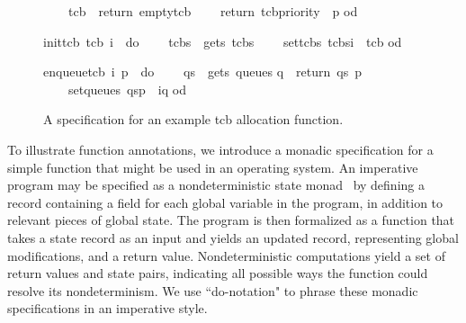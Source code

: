 \documentclass[submission]{eptcs}
\newcommand{\isafun}[1]{{\sf #1}}
\begin{document}
\begin{isabellebody}
\begin{isamarkuptext}
\begin{figure}[tb]
\begin{minipage}[t]{0.5\textwidth}
\begin{isabelle}
\ \ \ \ tcb\ {}\ \isafun{return}\ \isafun{empty{}tcb}{}\isanewline
\ \ \ \ \isafun{return}\ {}tcb{}priority\ {}{}\ p{}{}\isanewline
\isafun{od}\end{isabelle}
\begin{isabelle}\isafun{init{}tcb}\ tcb\ i\ {}\ \isafun{do}\isanewline
\ \ \ \ tcbs\ {}\ \isafun{gets}\ \isafun{tcbs}{}\isanewline
\ \ \ \ \isafun{set{}tcbs}\ {}tcbs{}i\ {}\ tcb{}{}\isanewline
\isafun{od}\end{isabelle}
\begin{isabelle}\isafun{enqueue{}tcb}\ i\ p\ {}\ \isafun{do}\isanewline
\ \ \ \ qs\ {}\ \isafun{gets}\ \isafun{queues}{}\isanewline
\isaindent{\ \ \ \ }q\ {}\ \isafun{return}\ {}qs\ p{}{}\isanewline
\ \ \ \ \isafun{set{}queues}\ {}qs{}p\ {}{}\ i{}q{}{}\isanewline
\isafun{od}\end{isabelle}
\end{minipage}
\caption{A specification for an example tcb allocation function.\label{fig:new-tcb-def}}
\end{figure}

To illustrate function annotations, we introduce a monadic specification
for a simple function that might be used in an operating system. An imperative
program may be specified as a nondeterministic state monad~\cite{Cock_KS_08}
by defining a record containing a field for each global
variable in the program, in addition to relevant pieces of
global state. The program is then formalized as a function
that takes a state record as an input and yields an updated
record, representing global modifications, and a return value.
Nondeterministic computations yield a set of return values and state
pairs, indicating all possible ways the function could resolve
its nondeterminism.
We use ``do-notation" to phrase these monadic specifications in 
an imperative style.


\end{isamarkuptext}
\end{isabellebody}
\end{document}
